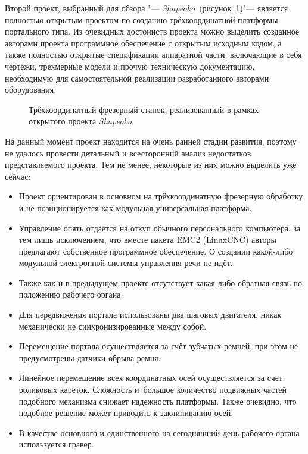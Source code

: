Второй проект, выбранный для обзора "--- \textit{Shapeoko}~(рисунок~\cref{fig:shapeoko})"--- является полностью открытым проектом по созданию трёхкоординатной платформы портального типа. Из очевидных достоинств проекта можно выделить созданное авторами проекта программное обеспечение с открытым исходным кодом, а также полностью открытые спецификации аппаратной части, включающие в себя чертежи, трехмерные модели и прочую техническую документацию, необходимую для самостоятельной реализации разработанного авторами оборудования.

\begin{figure}[ht]
	\caption{Трёхкоординатный фрезерный станок, реализованный в рамках открытого проекта \textit{Shapeoko}.}\label{fig:shapeoko}
\end{figure}

На данный момент проект находится на очень ранней стадии развития, поэтому не удалось провести детальный и всесторонний анализ недостатков представляемого проекта. Тем не менее, некоторые из них можно выделить уже сейчас:

\begin{itemize}
	\item Проект ориентирован в основном на трёхкоординатную фрезерную обработку и не позиционируется как модульная универсальная платформа.
	\item Управление опять отдаётся на откуп обычного персонального компьютера, за тем лишь исключением, что вместе пакета EMC2 (LinuxCNC) авторы предлагают собственное программное обеспечение. О создании какой-либо модульной электронной системы управления речи не идёт.
	\item Также как и в предыдущем проекте отсутствует какая-либо обратная связь по положению рабочего органа.
	\item Для передвижения портала использованы два шаговых двигателя, никак механически не синхронизированные между собой.
	\item Перемещение портала осуществляется за счёт зубчатых ремней, при этом не предусмотрены датчики обрыва ремня.
	\item Линейное перемещение всех координатных осей осуществляется за счет роликовых кареток. Сложность и~большое количество подвижных частей подобного механизма снижает надежность платформы. Также очевидно, что подобное решение может приводить к заклиниванию осей.
	\item В качестве основного и единственного на сегодняшний день рабочего органа используется гравер.
\end{itemize}


